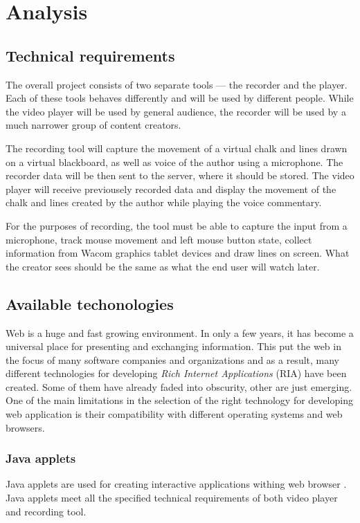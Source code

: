 \chapter{Analysis}

\section{Technical requirements}
The overall project consists of two separate tools --- the recorder and the player. Each of these tools behaves differently and will be used by different people. While the video player will be used by general audience, the recorder will be used by a much narrower group of content creators.

The recording tool will capture the movement of a virtual chalk and lines drawn on a virtual blackboard, as well as voice of the author using a microphone. The recorder data will be then sent to the server, where it should be stored. The video player will receive previousely recorded data and display the movement of the chalk and lines created by the author while playing the voice commentary.

For the purposes of recording, the tool must be able to capture the input from a microphone, track mouse movement and left mouse button state, collect information from Wacom graphics tablet devices and draw lines on screen. What the creator sees should be the same as what the end user will watch later.

\section{Available techonologies}
Web is a huge and fast growing environment. In only a few years, it has become a universal place for presenting and exchanging information. This put the web in the focus of many software companies and organizations and as a result, many different technologies for developing \textit{Rich Internet Applications} (RIA) have been created. Some of them have already faded into obscurity, other are just emerging. One of the main limitations in the selection of the right technology for developing web application is their compatibility with different operating systems and web browsers.

\subsection{Java applets}
Java applets are used for creating interactive applications withing web browser \cite{java}. Java applets meet all the specified technical requirements of both video player and recording tool.

